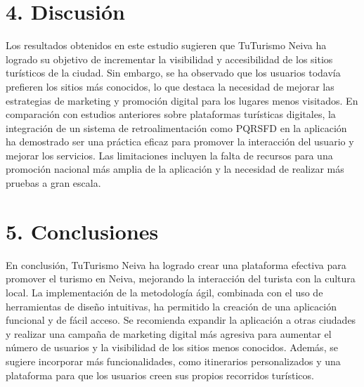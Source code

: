 \documentclass{IEEEoj-data}
\begin{document}
\section*{4. Discusión }

Los resultados obtenidos en este estudio sugieren que TuTurismo Neiva ha logrado su objetivo de incrementar la visibilidad y accesibilidad de los sitios turísticos de la ciudad. Sin embargo, se ha observado que los usuarios todavía prefieren los sitios más conocidos, lo que destaca la necesidad de mejorar las estrategias de marketing y promoción digital para los lugares menos visitados. En comparación con estudios anteriores sobre plataformas turísticas digitales, la integración de un sistema de retroalimentación como PQRSFD en la aplicación ha demostrado ser una práctica eficaz para promover la interacción del usuario y mejorar los servicios. Las limitaciones incluyen la falta de recursos para una promoción nacional más amplia de la aplicación y la necesidad de realizar más pruebas a gran escala.

\section*{5. Conclusiones}

En conclusión, TuTurismo Neiva ha logrado crear una plataforma efectiva para promover el turismo en Neiva, mejorando la interacción del turista con la cultura local. La implementación de la metodología ágil, combinada con el uso de herramientas de diseño intuitivas, ha permitido la creación de una aplicación funcional y de fácil acceso. Se recomienda expandir la aplicación a otras ciudades y realizar una campaña de marketing digital más agresiva para aumentar el número de usuarios y la visibilidad de los sitios menos conocidos. Además, se sugiere incorporar más funcionalidades, como itinerarios personalizados y una plataforma para que los usuarios creen sus propios recorridos turísticos.
\end{document}
